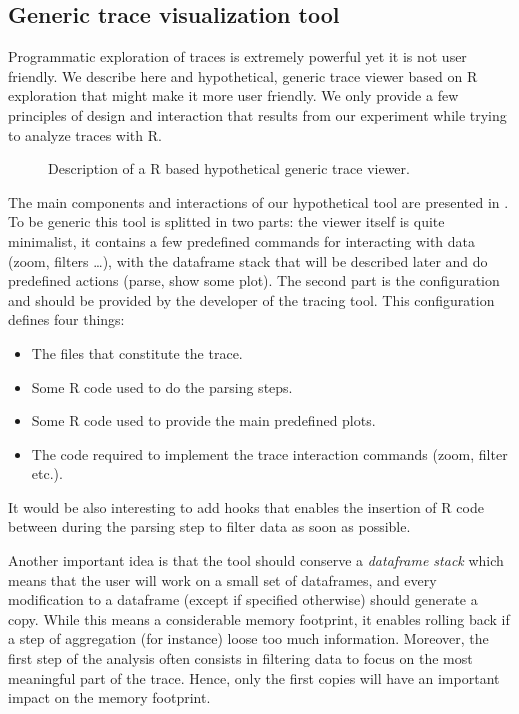 \subsection{Generic trace visualization tool}

Programmatic exploration of traces is extremely powerful yet it is not user friendly.
We describe here and hypothetical, generic trace viewer based on \gls{R} exploration that might make it more user friendly.
We only provide a few principles of design and interaction that results from our experiment while trying to analyze traces with \gls{R}.

\begin{figure}[htb]
    \centering
    
    \caption{Description of a R based hypothetical generic trace viewer.}
    \label{fig:generic-viewer}
\end{figure}

The main components and interactions of our hypothetical tool are presented in .
To be generic this tool is splitted in two parts: the viewer itself is quite minimalist, it contains a few predefined commands for interacting with data (zoom, filters \ldots), with the dataframe stack that will be described later and do predefined actions (parse, show some plot).
The second part is the configuration and should be provided by the developer of the tracing tool.
This configuration defines four things:
\begin{itemize}
    \item The files that constitute the trace.
    \item Some \gls{R} code used to do the parsing steps.
    \item Some \gls{R} code used to provide the main predefined plots.
    \item The code required to implement the trace interaction commands (zoom, filter etc.).
\end{itemize}
It would be also interesting to add hooks that enables the insertion of \gls{R} code between during the parsing step to filter data as soon as possible.

Another important idea is that the tool should conserve a \emph{dataframe stack} which means that the user will work on a small set of dataframes, and every modification to a dataframe (except if specified otherwise) should generate a copy.
While this means a considerable memory footprint, it enables rolling back if a step of aggregation (for instance) loose too much information.
Moreover, the first step of the analysis often consists in filtering data to focus on the most meaningful part of the trace.
Hence, only the first copies will have an important impact on the memory footprint.


